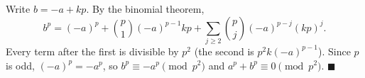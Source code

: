 Write $b=-a+kp$. By the binomial theorem,
\[b^p=(-a)^p+\binom p1(-a)^{p-1}kp+\sum_{j\ge2}\binom pj(-a)^{p-j}(kp)^j.\]
Every term after the first is divisible by $p^2$ (the second is $p^2k(-a)^{p-1}$). Since $p$ is odd, $(-a)^p=-a^p$, so $b^p\equiv-a^p\pmod{p^2}$ and $a^p+b^p\equiv0\pmod{p^2}$. $\blacksquare$
